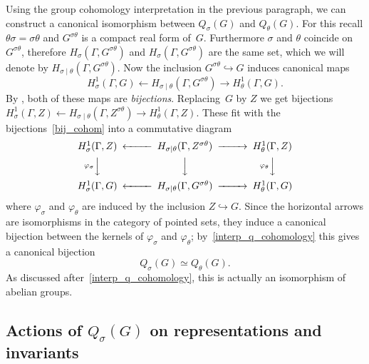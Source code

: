\documentclass[10pt,leqno]{article}
\begin{document}
Using the group cohomology interpretation in the previous paragraph, we can construct a canonical  isomorphism between $Q_{\sigma}(G)$ and $Q_{\theta}(G)$.
For this recall $\theta\sigma = \sigma\theta$ and $G^{\sigma\theta}$ is a compact real form of~$G$.
Furthermore $\sigma$ and $\theta$ coincide on $G^{\sigma\theta}$,
therefore  $H_{\sigma}(\Gamma, G^{\sigma\theta})$ and  $H_{\sigma}(\Gamma, G^{\sigma\theta})$ are the same set,
which we will denote by  $H_{\sigma\mid\theta}(\Gamma, G^{\sigma\theta})$.
Now the inclusion $G^{\sigma\theta} \hookrightarrow G$ induces canonical maps 
\begin{equation} \label{bij_cohom} H^{1}_{\sigma}(\Gamma, G) \longleftarrow H_{\sigma\mid\theta}(\Gamma, G^{\sigma\theta}) \longrightarrow H^{1}_{\theta}(\Gamma, G).\end{equation}
By \cite[Corollary~4.4 and Corollary 4.7]{galois}, both of these maps are \emph{bijections}.
Replacing~$G$ by $Z$ we get bijections $H^{1}_{\sigma}(\Gamma, Z) \leftarrow H_{\sigma\mid\theta}(\Gamma, Z^{\sigma\theta}) \rightarrow H^{1}_{\theta}(\Gamma, Z)$.
These fit with the bijections~\eqref{bij_cohom} into a commutative diagram
\[
\begin{CD}
H^{1}_{\sigma}(\Gamma, Z) @<<< H_{\sigma\mid\theta}(\Gamma, Z^{\sigma\theta})@>>> H^{1}_{\theta}(\Gamma, Z)
 \\
@V{\varphi_{\sigma}}VV @VVV @V{\varphi_{\theta}}VV  \\
H^{1}_{\sigma}(\Gamma, G) @<<< H_{\sigma\mid\theta}(\Gamma, G^{\sigma\theta})@>>> H^{1}_{\theta}(\Gamma, G)
\end{CD}
\]
where $\varphi_{\sigma}$ and $\varphi_{\theta}$ are induced by the inclusion $Z \hookrightarrow G$. Since the horizontal arrows are isomorphisms in the category of pointed sets, they induce a canonical bijection between the kernels of $\varphi_{\sigma}$ and $\varphi_{\theta}$; by~\eqref{interp_q_cohomology} this gives a canonical bijection 
\[ Q_{\sigma}(G) \simeq Q_{\theta}(G).\] 
As discussed after~\eqref{interp_q_cohomology}, this is actually an isomorphism of abelian groups. 




\subsection{Actions of $Q_\sigma(G)$ on representations and invariants}
\end{document}
